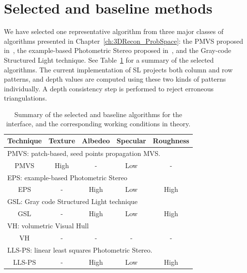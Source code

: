 \section{Selected and baseline methods}
We have selected one representative algorithm from three major classes of algorithms presented in Chapter~\ref{ch:3DRecon_ProbSpace}: the PMVS proposed in~\cite{furukawa2010accurate}, the example-based Photometric Stereo proposed in~\cite{hertzmann2005example}, and the Gray-code Structured Light technique. See Table~\ref{tab:selected_algos} for a summary of the selected algorithms. The current implementation of SL projects both column and row patterns, and depth values are computed using these two kinds of patterns individually. A depth consistency step is performed to reject erroneous triangulations.
\begin{table}[!htbp]
\centering
\begin{tabular}{c|c|c|c|c}
\toprule
Technique & Texture & Albedeo & Specular & Roughness\\
\midrule
\multicolumn{5}{l}{PMVS: patch-based, seed points propagation MVS.}\\
\midrule
PMVS & High & - & Low & -\\
\midrule
\multicolumn{5}{l}{EPS: example-based Photometric Stereo}\\
\midrule
EPS & - & High & Low & High \\
\midrule
\multicolumn{5}{l}{GSL: Gray code Structured Light technique}\\
\midrule
GSL & - & High & Low & High\\
\midrule
\multicolumn{5}{l}{VH: volumetric Visual Hull}\\
\midrule
VH & - & - & - & -\\
\midrule
\multicolumn{5}{l}{LLS-PS: linear least squares Photometric Stereo.}\\
\midrule
LLS-PS & - & High & Low & High\\
\bottomrule
\end{tabular}
\caption{Summary of the selected and baseline algorithms for the interface, and the corresponding working conditions in theory.}
\label{tab:selected_algos}
\end{table}

